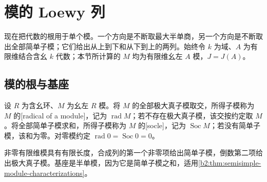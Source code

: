 
\section{模的 Loewy 列}
\label{b2:sec:1502}

现在把代数的根用于单个模。一个方向是不断取最大半单商，另一个方向是不断取出全部简单子模；它们给出从上到下和从下到上的两列。始终令 \(k\) 为域、\(A\) 为有限维结合含幺 \(k\) 代数；本节所计算的 \(M\) 均为有限维幺左 \(A\) 模，\(J=J(A)\)。

%
%

\subsection{模的根与基座}
\label{b2:subsec:1502:01}

\begin{definition}\label{b2:def:module-radical-socle}
	设 \(R\) 为含幺环、\(M\) 为幺左 \(R\) 模。将 \(M\) 的全部极大真子模取交，所得子模称为 \(M\) 的[radical of a module]，记为 \(\operatorname{rad}M\)；若不存在极大真子模，该交按约定取 \(M\)。将全部简单子模求和，所得子模称为 \(M\) 的[socle]，记为 \(\operatorname{Soc}M\)；若没有简单子模，该和为零。对零模约定 \(\operatorname{rad}0=\operatorname{Soc}0=0\)。
\end{definition}

非零有限维模具有有限长度，合成列的第一个非零项给出简单子模，倒数第二项给出极大真子模。基座是半单模，因为它是简单子模之和，适用\cref{b2:thm:semisimple-module-characterizations}。

